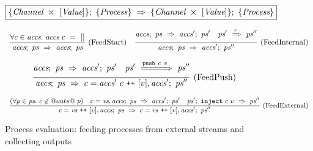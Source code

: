 
\begin{figure}

$$
  \boxed{
    \{\textit{Channel} ~\times~ [\textit{Value}]\};~\{ \textit{Process} \}~\Rightarrow~\{\textit{Channel} ~\times~ [\textit{Value}]\};~\{ \textit{Process} \}
  }
$$

\newcommand\vs {\ti{vs}}
\newcommand\accs {\ti{accs}}
\newcommand\network {\ti{ps}}

$$
\ruleIN{
  \forall c \in \accs.~
  \accs~c~=~[]
}{
  \ProcsFeed
    {\accs}
    {\network}
    {\accs}
    {\network}
}{FeedStart}
%
\ruleIN{
  \ProcsFeed
    {\accs}
    {\network}
    {\accs'}
    {\network'}
\quad
  \ProcsShake
    {\network'}
    {\tau}
    {\network''}
}{
  \ProcsFeed
    {\accs}
    {\network}
    {\accs'}
    {\network''}
}{FeedInternal}
$$

$$
\ruleIN{
  \ProcsFeed
    {\accs}
    {\network}
    {\accs'}
    {\network'}
\quad
  \ProcsShake
    {\network'}
    {\Push~c~v}
    {\network''}
}{
  \ProcsFeed
    {\accs}
    {\network}
    {c=\accs'~c \listappend [v], \accs'}
    {\network''}
}{FeedPush}
$$

$$
\ruleIN{
  (\forall p \in \network.~c \not\in @outs@~p)
\quad
  \ProcsFeed
    {c=\vs, \accs}
    {\network}
    {\accs'}
    {\network'}
\quad
  \ProcsInject
    {\network'}
    {c}{v}
    {\network''}
}{
  \ProcsFeed
    {c=\vs \listappend [v], \accs}
    {\network}
    {c=\vs \listappend [v], \accs'}
    {\network''}
}{FeedExternal}
$$


\caption{Process evaluation: feeding processes from external streams and collecting outputs}
\label{fig:Process:Eval:Feed}
\end{figure}

